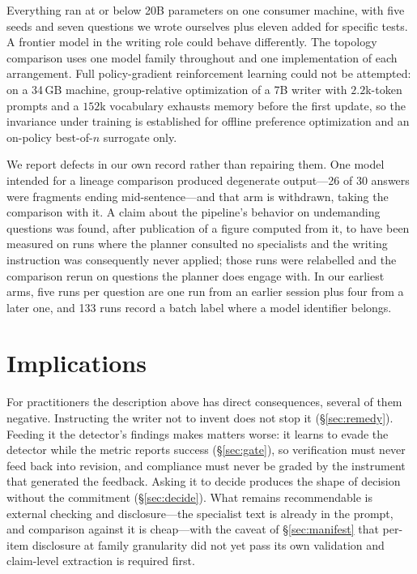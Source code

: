 \documentclass[11pt]{article}
\begin{document}
Everything ran at or below 20B parameters on one consumer machine, with five
seeds and seven questions we wrote ourselves plus eleven added for specific
tests. A frontier model in the writing role could behave differently. The
topology comparison uses one model family throughout and one implementation of
each arrangement. Full policy-gradient reinforcement learning could not be
attempted: on a 34\,GB machine, group-relative optimization of a 7B writer with
$2.2$k-token prompts and a $152$k vocabulary exhausts memory before the first
update, so the invariance under training is established for offline preference
optimization and an on-policy best-of-$n$ surrogate only.

We report defects in our own record rather than repairing them. One model
intended for a lineage comparison produced degenerate output---26 of 30
answers were fragments ending mid-sentence---and that arm is withdrawn, taking
the comparison with it. A claim about the pipeline's behavior on undemanding
questions was found, after publication of a figure computed from it, to have
been measured on runs where the planner consulted no specialists and the
writing instruction was consequently never applied; those runs were relabelled
and the comparison rerun on questions the planner does engage with. In our
earliest arms, five runs per question are one run from an earlier session plus
four from a later one, and 133 runs record a batch label where a model
identifier belongs.

\section{Implications}
For practitioners the description above has direct consequences, several of
them negative. Instructing the writer not to invent does not stop it
(\S\ref{sec:remedy}). Feeding it the detector's findings makes matters
worse: it learns to evade the detector while the metric reports success
(\S\ref{sec:gate}), so verification must never feed back into revision,
and compliance must never be graded by the instrument that generated the
feedback. Asking it to decide produces the shape of decision without the
commitment (\S\ref{sec:decide}). What remains recommendable is external
checking and disclosure---the specialist text is already in the prompt, and
comparison against it is cheap---with the caveat of \S\ref{sec:manifest}
that per-item disclosure at family granularity did not yet pass its own
validation and claim-level extraction is required first.
\end{document}
